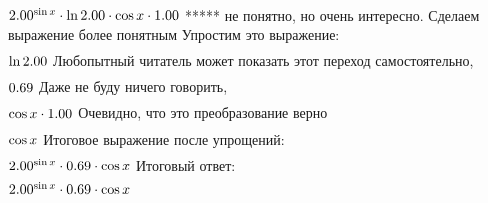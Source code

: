 \begin{gather}
\end{gather}
\begin{math}
2.00 ^ {\sin x }\cdot \ln 2.00 \cdot \cos x \cdot 1.00 \\
\end{math}
***** не понятно, но очень интересно. Сделаем выражение более понятным
Упростим это выражение: 
\begin{gather}
\end{gather}
\begin{math}
\ln 2.00 \\
\end{math}
Любопытный читатель может показать этот переход самостоятельно, 
\begin{gather}
\end{gather}
\begin{math}
0.69 \\
\end{math}
Даже не буду ничего говорить, 
\begin{gather}
\end{gather}
\begin{math}
\cos x \cdot 1.00 \\
\end{math}
Очевидно, что это преобразование верно
\begin{gather}
\end{gather}
\begin{math}
\cos x \\
\end{math}
Итоговое выражение после упрощений:
\begin{gather}
\end{gather}
\begin{math}
2.00 ^ {\sin x }\cdot 0.69 \cdot \cos x \\
\end{math}
Итоговый ответ: 
\begin{gather}
\end{gather}
\begin{math}
2.00 ^ {\sin x }\cdot 0.69 \cdot \cos x \\
\end{math}
